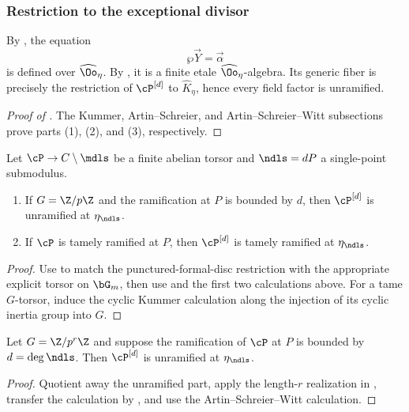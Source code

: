 \subsubsection*{Restriction to the exceptional divisor}

By , the equation
\[
    \wp\vec Y=\vec\alpha
\]
is defined over $\widehat\Oo_\eta$. By
, it is a finite etale
$\widehat\Oo_\eta$-algebra. Its generic fiber is precisely the restriction of
$\cP^{[d]}$ to $\widehat K_\eta$, hence every field factor is unramified.

\begin{proof}[Proof of ]
The Kummer, Artin--Schreier, and Artin--Schreier--Witt subsections prove parts
(1), (2), and (3), respectively.
\end{proof}

\begin{cor}\label{cor:ramification_after_blowup_is_tame}
Let $\cP\to C\setminus\mdls$ be a finite abelian torsor and
$\ndls=dP$ a single-point submodulus.
\begin{enumerate}
 \item If $G=\Z/p\Z$ and the ramification at $P$ is bounded by $d$, then
 $\cP^{[d]}$ is unramified at $\eta_\ndls$.
 \item If $\cP$ is tamely ramified at $P$, then $\cP^{[d]}$ is tamely
 ramified at $\eta_\ndls$.
\end{enumerate}
\end{cor}
\begin{proof}
Use  to match the punctured-formal-disc
restriction with the appropriate explicit torsor on $\bG_m$, then use
 and the first two calculations above. For a tame
$G$-torsor, induce the cyclic Kummer calculation along the injection of its
cyclic inertia group into $G$.
\end{proof}

\begin{theorem}\label{theorem:ramification_after_blowup_is_tame_for_p_power}
Let $G=\Z/p^r\Z$ and suppose the ramification of $\cP$ at $P$ is bounded by
$d=\deg\ndls$. Then $\cP^{[d]}$ is unramified at $\eta_\ndls$.
\end{theorem}
\begin{proof}
Quotient away the unramified part, apply the length-$r$ realization in
, transfer the calculation by
, and use the Artin--Schreier--Witt calculation.
\end{proof}

